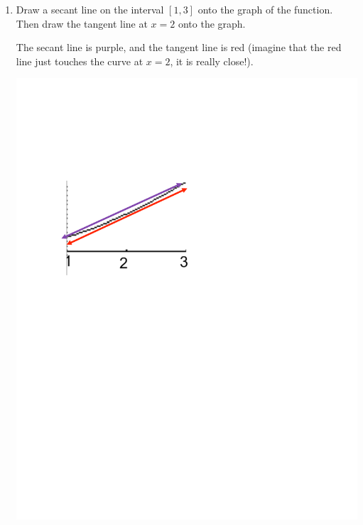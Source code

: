 \documentclass[handout,nooutcomes]{ximera}
\begin{document}
\begin{problem}
\begin{enumerate}
		\item  Draw a secant line on the interval $[1,3]$ onto the graph of the function.  Then draw the tangent line at $x=2$ onto the graph. 
		\begin{freeResponse}		 
		The secant line is purple, and the tangent line is red (imagine that the red line just touches the curve at $x=2$, it is really close!).
			\begin{image}
			\includegraphics[trim= 80 500 300 160]{Figure6.pdf}
			\end{image}
		\end{freeResponse}
			
		\end{enumerate}
			
			
			

	
\end{problem}










								
				
				
	
\end{document}
